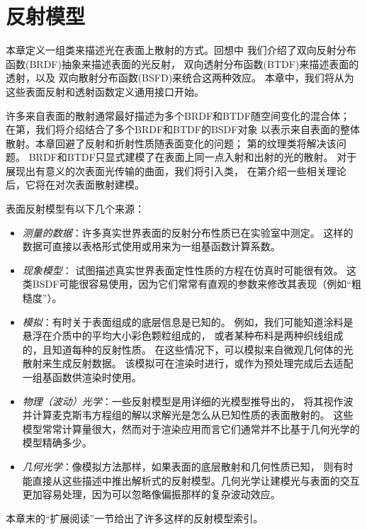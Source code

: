 \chapter{反射模型}\label{chap:反射模型}
\setcounter{sidenote}{1}
本章定义一组类来描述光在表面上散射的方式。回想中
我们介绍了双向反射分布函数(BRDF)抽象来描述表面的光反射，
双向透射分布函数(BTDF)来描述表面的透射，以及
双向散射分布函数(BSFD)来统合这两种效应。
本章中，我们将从为这些表面反射和透射函数定义通用接口开始。

许多来自表面的散射通常最好描述为多个BRDF和BTDF随空间变化的混合体；
在第，我们将介绍结合了多个BRDF和BTDF的BSDF对象
以表示来自表面的整体散射。本章回避了反射和折射性质随表面变化的问题；
第的纹理类将解决该问题。
BRDF和BTDF只显式建模了在表面上同一点入射和出射的光的散射。
对于展现出有意义的次表面光传输的曲面，我们将引入类，
在第介绍一些相关理论后，它将在对次表面散射建模。

表面反射模型有以下几个来源：
\begin{itemize}
    \item \emph{测量的数据}：许多真实世界表面的反射分布性质已在实验室中测定。
          这样的数据可直接以表格形式使用或用来为一组基函数计算系数。
    \item \emph{现象模型}：
          试图描述真实世界表面定性性质的方程在仿真时可能很有效。
          这类BSDF可能很容易使用，因为它们常常有直观的参数来修改其表现（例如“粗糙度”）。
    \item \emph{模拟}：有时关于表面组成的底层信息是已知的。
          例如，我们可能知道涂料是悬浮在介质中的平均大小彩色颗粒组成的，
          或者某种布料是两种织线组成的，且知道每种的反射性质。
          在这些情况下，可以模拟来自微观几何体的光散射来生成反射数据。
          该模拟可在渲染时进行，或作为预处理完成后去适配一组基函数供渲染时使用。
    \item \emph{物理（波动）光学}：一些反射模型是用详细的光模型推导出的，
          将其视作波并计算麦克斯韦方程组的解以求解光是怎么从已知性质的表面散射的。
          这些模型常常计算量很大，然而对于渲染应用而言它们通常并不比基于几何光学的模型精确多少。
    \item \emph{几何光学}：像模拟方法那样，如果表面的底层散射和几何性质已知，
          则有时能直接从这些描述中推出解析式的反射模型。几何光学让建模光与表面的交互
          更加容易处理，因为可以忽略像偏振那样的复杂波动效应。
\end{itemize}
本章末的“扩展阅读”一节给出了许多这样的反射模型索引。

